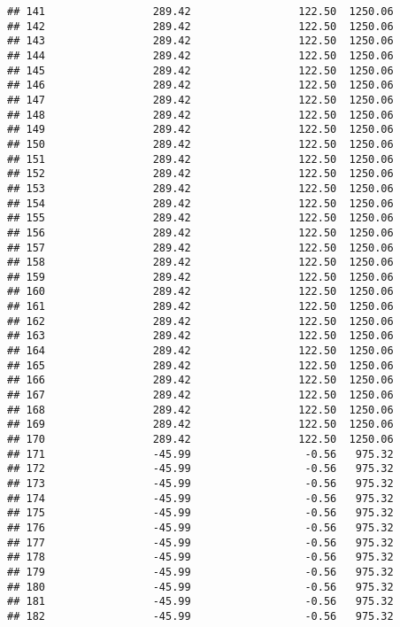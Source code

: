 \documentclass[]{article}
\begin{document}
\begin{verbatim}
## 141                 289.42                 122.50  1250.06
## 142                 289.42                 122.50  1250.06
## 143                 289.42                 122.50  1250.06
## 144                 289.42                 122.50  1250.06
## 145                 289.42                 122.50  1250.06
## 146                 289.42                 122.50  1250.06
## 147                 289.42                 122.50  1250.06
## 148                 289.42                 122.50  1250.06
## 149                 289.42                 122.50  1250.06
## 150                 289.42                 122.50  1250.06
## 151                 289.42                 122.50  1250.06
## 152                 289.42                 122.50  1250.06
## 153                 289.42                 122.50  1250.06
## 154                 289.42                 122.50  1250.06
## 155                 289.42                 122.50  1250.06
## 156                 289.42                 122.50  1250.06
## 157                 289.42                 122.50  1250.06
## 158                 289.42                 122.50  1250.06
## 159                 289.42                 122.50  1250.06
## 160                 289.42                 122.50  1250.06
## 161                 289.42                 122.50  1250.06
## 162                 289.42                 122.50  1250.06
## 163                 289.42                 122.50  1250.06
## 164                 289.42                 122.50  1250.06
## 165                 289.42                 122.50  1250.06
## 166                 289.42                 122.50  1250.06
## 167                 289.42                 122.50  1250.06
## 168                 289.42                 122.50  1250.06
## 169                 289.42                 122.50  1250.06
## 170                 289.42                 122.50  1250.06
## 171                 -45.99                  -0.56   975.32
## 172                 -45.99                  -0.56   975.32
## 173                 -45.99                  -0.56   975.32
## 174                 -45.99                  -0.56   975.32
## 175                 -45.99                  -0.56   975.32
## 176                 -45.99                  -0.56   975.32
## 177                 -45.99                  -0.56   975.32
## 178                 -45.99                  -0.56   975.32
## 179                 -45.99                  -0.56   975.32
## 180                 -45.99                  -0.56   975.32
## 181                 -45.99                  -0.56   975.32
## 182                 -45.99                  -0.56   975.32

\end{verbatim}
\end{document}
